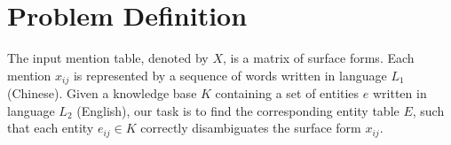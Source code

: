\section{Problem Definition}
\label{sec:problem}


The input mention table, denoted by $X$,
is a matrix of surface forms.
Each mention $x_{ij}$ is represented by a sequence of words
written in language $L_1$ (Chinese). 
Given a knowledge base $K$ containing a set of entities $e$ written in language $L_2$ (English),
our task is to find the corresponding entity table $E$,
such that each entity $e_{ij} \in K$ correctly disambiguates the surface form $x_{ij}$. 



